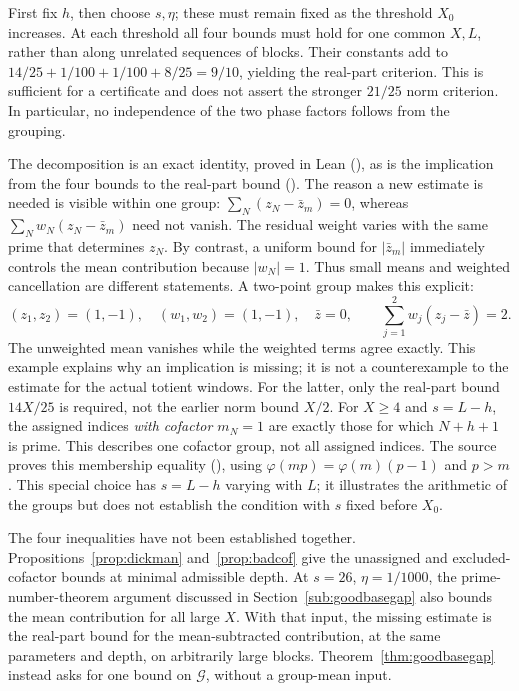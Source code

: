 First fix $h$, then choose $s,\eta$; these must remain fixed as the
threshold $X_0$ increases. At each threshold all four bounds must hold
for one common $X,L$, rather than along unrelated sequences of blocks.
Their constants add to $14/25+1/100+1/100+8/25=9/10$, yielding the
real-part criterion. This is sufficient for a certificate and does not
assert the stronger $21/25$ norm criterion. In particular, no
independence of the two phase factors follows from the grouping.


The decomposition is an exact identity, proved in Lean
(),
as is the implication from the four bounds to the real-part bound
().
The reason a new estimate is needed is visible within one group:
$\sum_N(z_N-\bar z_m)=0$, whereas
$\sum_Nw_N(z_N-\bar z_m)$ need not vanish. The residual weight varies
with the same prime that determines $z_N$. By contrast, a uniform
bound for $|\bar z_m|$ immediately controls the mean contribution
because $|w_N|=1$. Thus small means and weighted cancellation are
different statements.
A two-point group makes this explicit:
\[
 (z_1,z_2)=(1,-1),\quad (w_1,w_2)=(1,-1),\quad \bar z=0,
 \qquad \sum_{j=1}^2w_j(z_j-\bar z)=2.
\]
The unweighted mean vanishes while the weighted terms agree exactly.
This example explains why an implication is missing; it is not a
counterexample to the estimate for the actual totient windows. For the latter, only the real-part bound
$14X/25$ is required, not the earlier norm bound $X/2$.
For $X\ge4$ and $s=L-h$, the assigned indices \emph{with cofactor
$m_N=1$} are exactly those for which $N+h+1$ is prime. This describes
one cofactor group, not all assigned indices. The source proves this
membership equality
(),
using $\varphi(mp)=\varphi(m)(p-1)$ and $p>m$.
This special choice has $s=L-h$ varying with $L$; it illustrates the
arithmetic of the groups but does not establish the condition with $s$
fixed before $X_0$.

The four inequalities have not been established together.
Propositions~\ref{prop:dickman} and~\ref{prop:badcof} give the unassigned
and excluded-cofactor bounds at minimal admissible depth. At $s=26$,
$\eta=1/1000$, the prime-number-theorem argument discussed in
Section~\ref{sub:goodbasegap} also bounds the mean contribution for all
large $X$. With that input, the missing estimate is the real-part bound
for the mean-subtracted contribution, at the same parameters and depth,
on arbitrarily large blocks. Theorem~\ref{thm:goodbasegap} instead asks
for one bound on $\mathcal G$, without a group-mean input.



